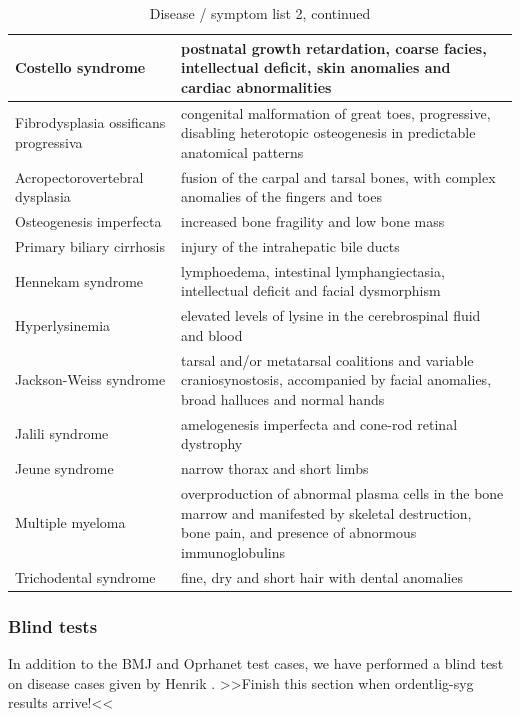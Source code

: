 \begin{table}[!h]
\caption{Disease / symptom list 2, continued}
\label{OrphanetCases2}
\begin{tabular}{| p{6.5cm} | p{6.5cm}|}
\hline
Costello syndrome & postnatal growth retardation, coarse facies, intellectual deficit, skin anomalies and cardiac abnormalities \\
\hline
Fibrodysplasia ossificans progressiva & congenital malformation of great toes, progressive, disabling heterotopic osteogenesis in predictable anatomical patterns \\
\hline
Acropectorovertebral dysplasia & fusion of the carpal and tarsal bones, with complex anomalies of the fingers and toes \\
\hline
Osteogenesis imperfecta & increased bone fragility and low bone mass \\
\hline
Primary biliary cirrhosis & injury of the intrahepatic bile ducts \\
\hline
Hennekam syndrome & lymphoedema, intestinal lymphangiectasia, intellectual deficit and facial dysmorphism \\
\hline
Hyperlysinemia & elevated levels of lysine in the cerebrospinal fluid and blood \\
\hline
Jackson-Weiss syndrome & tarsal and/or metatarsal coalitions and variable craniosynostosis, accompanied by facial anomalies, broad halluces and normal hands \\
\hline
Jalili syndrome & amelogenesis imperfecta and cone-rod retinal dystrophy \\
\hline
Jeune syndrome & narrow thorax and short limbs \\
\hline
Multiple myeloma & overproduction of abnormal plasma cells in the bone marrow and manifested by skeletal destruction, bone pain, and presence of abnormous immunoglobulins \\
\hline
Trichodental syndrome & fine, dry and short hair with dental anomalies \\
\hline
\end{tabular}
\end{table}

\subsubsection{Blind tests}
In addition to the BMJ and Oprhanet test cases, we have performed a
blind test on disease cases given by Henrik \cite{TheDude}.  >>Finish
this section when ordentlig-syg results arrive!<<

